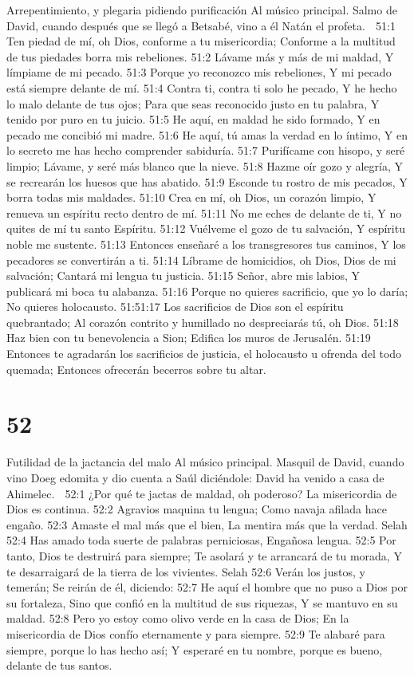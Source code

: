 Arrepentimiento, y plegaria pidiendo purificación 
Al músico principal. Salmo de David, cuando después que se llegó a Betsabé, vino a él Natán el profeta. 

51:1 Ten piedad de mí, oh Dios, conforme a tu misericordia; 
Conforme a la multitud de tus piedades borra mis rebeliones. 
51:2 Lávame más y más de mi maldad, 
Y límpiame de mi pecado. 
51:3 Porque yo reconozco mis rebeliones, 
Y mi pecado está siempre delante de mí. 
51:4 Contra ti, contra ti solo he pecado, 
Y he hecho lo malo delante de tus ojos; 
Para que seas reconocido justo en tu palabra, 
Y tenido por puro en tu juicio. 
51:5 He aquí, en maldad he sido formado, 
Y en pecado me concibió mi madre. 
51:6 He aquí, tú amas la verdad en lo íntimo, 
Y en lo secreto me has hecho comprender sabiduría. 
51:7 Purifícame con hisopo, y seré limpio; 
Lávame, y seré más blanco que la nieve. 
51:8 Hazme oír gozo y alegría, 
Y se recrearán los huesos que has abatido. 
51:9 Esconde tu rostro de mis pecados, 
Y borra todas mis maldades. 
51:10 Crea en mí, oh Dios, un corazón limpio, 
Y renueva un espíritu recto dentro de mí. 
51:11 No me eches de delante de ti, 
Y no quites de mí tu santo Espíritu. 
51:12 Vuélveme el gozo de tu salvación, 
Y espíritu noble me sustente. 
51:13 Entonces enseñaré a los transgresores tus caminos, 
Y los pecadores se convertirán a ti. 
51:14 Líbrame de homicidios, oh Dios, Dios de mi salvación; 
Cantará mi lengua tu justicia. 
51:15 Señor, abre mis labios, 
Y publicará mi boca tu alabanza. 
51:16 Porque no quieres sacrificio, que yo lo daría; 
No quieres holocausto. 
51:51:17 Los sacrificios de Dios son el espíritu quebrantado; 
Al corazón contrito y humillado no despreciarás tú, oh Dios. 
51:18 Haz bien con tu benevolencia a Sion; 
Edifica los muros de Jerusalén. 
51:19 Entonces te agradarán los sacrificios de justicia, 
el holocausto u ofrenda del todo quemada; 
Entonces ofrecerán becerros sobre tu altar. 

\chapter{52}

Futilidad de la jactancia del malo 
Al músico principal. Masquil de David, cuando vino Doeg edomita y dio cuenta a Saúl diciéndole: David ha venido a casa de Ahimelec. 

52:1 ¿Por qué te jactas de maldad, oh poderoso? 
La misericordia de Dios es continua. 
52:2 Agravios maquina tu lengua; 
Como navaja afilada hace engaño. 
52:3 Amaste el mal más que el bien, 
La mentira más que la verdad. Selah 
52:4 Has amado toda suerte de palabras perniciosas, 
Engañosa lengua. 
52:5 Por tanto, Dios te destruirá para siempre; 
Te asolará y te arrancará de tu morada, 
Y te desarraigará de la tierra de los vivientes. Selah 
52:6 Verán los justos, y temerán; 
Se reirán de él, diciendo: 
52:7 He aquí el hombre que no puso a Dios por su fortaleza, 
Sino que confió en la multitud de sus riquezas, 
Y se mantuvo en su maldad. 
52:8 Pero yo estoy como olivo verde en la casa de Dios; 
En la misericordia de Dios confío eternamente y para siempre. 
52:9 Te alabaré para siempre, porque lo has hecho así; 
Y esperaré en tu nombre, porque es bueno, delante de tus santos. 

